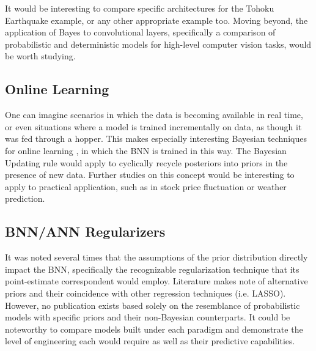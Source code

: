 It would be interesting to compare specific architectures for the Tohoku Earthquake example, or any other appropriate example too.  Moving beyond, the application of Bayes to convolutional layers, specifically a comparison of probabilistic and deterministic models for high-level computer vision tasks, would be worth studying.


\subsection{Online Learning}
One can imagine scenarios in which the data is becoming available in real time, or even situations where a model is trained incrementally on data, as though it was fed through a hopper.  This makes especially interesting Bayesian techniques for online learning \cite{opper1999bayesian}, in which the BNN is trained in this way.  The Bayesian Updating rule would apply to cyclically recycle posteriors into priors in the presence of new data.  Further studies on this concept would be interesting to apply to practical application, such as in stock price fluctuation or weather prediction.

\subsection{BNN/ANN Regularizers}
It was noted several times that the assumptions of the prior distribution directly impact the BNN, specifically the recognizable regularization technique that its point-estimate correspondent would employ.  Literature \cite{vladimirova2019understanding} \cite{chiuso2016regularization} makes note of alternative priors and their coincidence with other regression techniques (i.e. LASSO).  However, no publication exists based solely on the resemblance of probabilistic models with specific priors and their non-Bayesian counterparts.  It could be noteworthy to compare models built under each paradigm and demonstrate the level of engineering each would require as well as their predictive capabilities.

